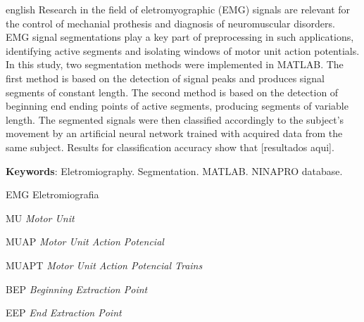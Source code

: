\documentclass[
	12pt,				%
	openright,			%
	oneside,
	a4paper,			%
	english,			%
	francais,				%
	spanish,			%
	brazil				%
	]{abntex2}
\begin{document}
\begin{resumo}[Abstract]
 \begin{otherlanguage*}{english}
   Research in the field of eletromyographic (EMG) signals are relevant for the control of mechanial prothesis and diagnosis of neuromuscular disorders. EMG signal segmentations play a key part of preprocessing in such applications, identifying active segments and isolating windows of motor unit action potentials. In this study, two segmentation methods were implemented in MATLAB. The first method is based on the detection of signal peaks and produces signal segments of constant length. The second method is based on the detection of beginning end ending points of active segments, producing segments of variable length. The segmented signals were then classified accordingly to the subject's movement by an artificial neural network trained with acquired data from the same subject. Results for classification accuracy show that [resultados aqui].

   \vspace{\onelineskip}
 
   \noindent 
   \textbf{Keywords}: Eletromiography. Segmentation. MATLAB. NINAPRO database.
 \end{otherlanguage*}
\end{resumo}

\listoffigures*
\cleardoublepage

\listoftables*
\cleardoublepage

\begin{siglas}
  	\item[EMG] Eletromiografia
	\item[MU] \emph{Motor Unit}
  	\item[MUAP] \emph{Motor Unit Action Potencial}
	\item[MUAPT] \emph{Motor Unit Action Potencial Trains}
	\item[BEP] \emph{Beginning Extraction Point}
	\item[EEP] \emph{End Extraction Point}
\end{siglas}

\tableofcontents*
\cleardoublepage
\end{document}
